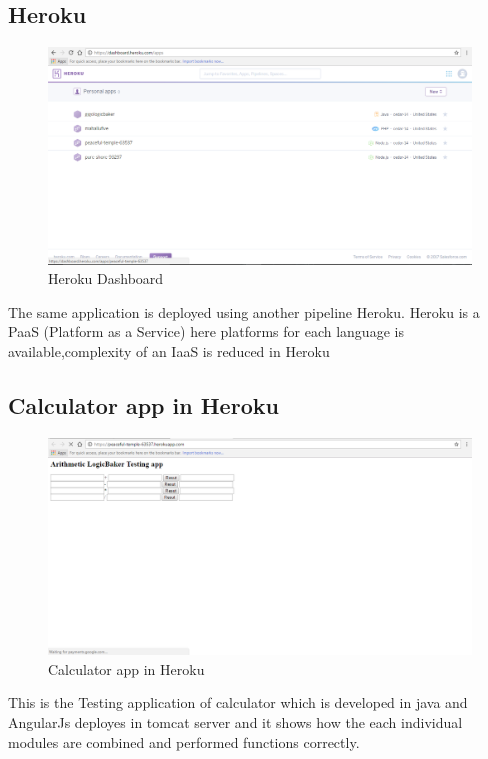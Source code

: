 \documentclass[12pt,a4paper,oneside]{report}
\begin{document}
{\subsection{Heroku}

\begin{figure}[h]
\begin{center}
\includegraphics[scale=.47]{hrk.png}
\caption{Heroku Dashboard}
\label{Heroku Dashboard}
\end{center}
\end{figure}

 \par The same application is deployed using another pipeline Heroku. Heroku is a PaaS (Platform as a Service) here platforms for each language is available,complexity of an IaaS is reduced in Heroku
\newpage
\subsection{Calculator app in Heroku}
\begin{figure}[h]
\begin{center}
\includegraphics[scale=.47]{app1.png}
\caption{Calculator app in Heroku}
\label{Calculator app in Heroku}
\end{center}
\end{figure}
\par This is the Testing application of calculator which is developed in java and AngularJs deployes in tomcat server and it shows how the each individual modules are combined and performed functions correctly.
\newpage
}
\end{document}
